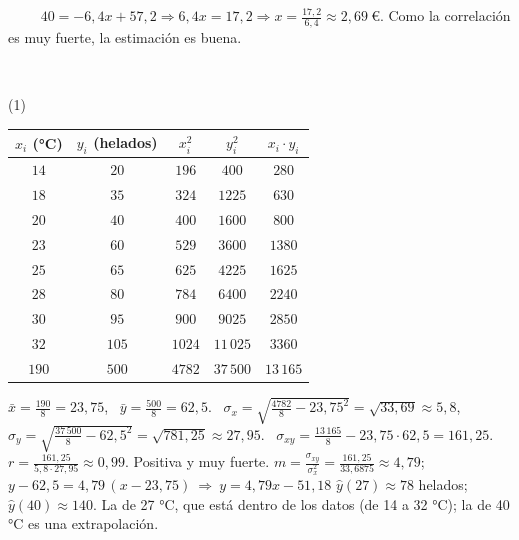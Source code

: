 \documentclass[11pt,a4paper]{article}
\newcommand{\estrelles}[1]{{\color{accent}\ifcase#1\or\faStar\faStar[regular]\faStar[regular]\or\faStar\faStar\faStar[regular]\or\faStar\faStar\faStar\fi}}
\newcounter{exer}
\newcommand{\ex}[1]{\par\needspace{4\baselineskip}\medskip\stepcounter{exer}\noindent{\color{navy}\bfseries\theexer.}\ \ {\small\estrelles{#1}}\ \ }
\newcommand{\res}[1]{\boxed{#1}}\newcommand{\rest}[1]{\fbox{#1}}
\begin{document}
\ex{2} $40=-6{,}4x+57{,}2\Rightarrow6{,}4x=17{,}2\Rightarrow x=\frac{17{,}2}{6{,}4}\approx\res{2{,}69\ \text{€}}$. Como la correlación es muy fuerte, la estimación es buena.

\ex{3} \begin{tasks}(1)
  \task \par\smallskip\begin{center}{\renewcommand{\arraystretch}{1.15}\small\begin{tabular}{|c|c|c|c|c|}\hline $x_i$ (°C) & $y_i$ (helados) & $x_i^2$ & $y_i^2$ & $x_i\cdot y_i$\\\hline $14$ & $20$ & $196$ & $400$ & $280$\\ $18$ & $35$ & $324$ & $1225$ & $630$\\ $20$ & $40$ & $400$ & $1600$ & $800$\\ $23$ & $60$ & $529$ & $3600$ & $1380$\\ $25$ & $65$ & $625$ & $4225$ & $1625$\\ $28$ & $80$ & $784$ & $6400$ & $2240$\\ $30$ & $95$ & $900$ & $9025$ & $2850$\\ $32$ & $105$ & $1024$ & $11\,025$ & $3360$\\\hline $190$ & $500$ & $4782$ & $37\,500$ & $13\,165$\\\hline\end{tabular}}\end{center}$\bar x=\frac{190}{8}=23{,}75$, \ $\bar y=\frac{500}{8}=62{,}5$. \ $\sigma_x=\sqrt{\frac{4782}{8}-23{,}75^2}=\sqrt{33{,}69}\approx 5{,}8$, \ $\sigma_y=\sqrt{\frac{37\,500}{8}-62{,}5^2}=\sqrt{781{,}25}\approx 27{,}95$. \ $\sigma_{xy}=\frac{13\,165}{8}-23{,}75\cdot 62{,}5=161{,}25$. \ $r=\frac{161{,}25}{5{,}8\cdot 27{,}95}\approx\res{0{,}99}$. Positiva y muy fuerte.
  \task $m=\frac{\sigma_{xy}}{\sigma_x^2}=\frac{161{,}25}{33{,}6875}\approx 4{,}79$; \ $y-62{,}5=4{,}79\,(x-23{,}75)\ \Rightarrow\ \res{y=4{,}79x-51{,}18}$
  \task $\hat y(27)\approx\res{78}$ helados; \ $\hat y(40)\approx\res{140}$. La de 27 °C, que está dentro de los datos (de 14 a 32 °C); la de 40 °C es una extrapolación.\par\smallskip\begin{center}
\end{center}
\end{tasks}
\end{document}

